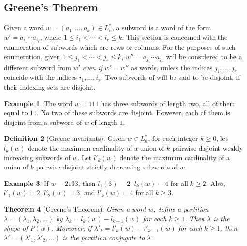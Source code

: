 \documentclass[11pt]{amsart}
\newtheorem{theorem}{Theorem}[subsection]
\theoremstyle{definition}
\newtheorem{definition}[theorem]{Definition}
\theoremstyle{example}
\newtheorem{example}[theorem]{Example}
\begin{document}
\subsection{Greene's Theorem}
\label{sec:greenes-theorem}
Given a word $w = (a_1,\dotsc,a_k)\in L_n^*$, a subword is a word of the form $w' = a_{i_1}\dotsb a_{i_r}$, where $1\leq i_1<\dotsb < i_r\leq k$.
This section is concerned with the enumeration of subwords which are rows or columns.
For the purposes of such enumeration, given $1 \leq j_1<\dotsb <j_r\leq k$, $w'' = a_{j_1}\dotsb a_{j_r}$ will be considered to be a different subword from $w'$ \emph{even if} $w'=w''$ as words, unless the indices $j_1,\dotsc, j_r$ coincide with the indices $i_1,\dotsc,i_r$.
Two subwords of will be said to be disjoint, if their indexing sets are disjoint.
\begin{example}
  The word $w=111$ has three subwords of length two, all of them equal to $11$.
  No two of these subwords are disjoint.
  However, each of them is disjoint from a subword of $w$ of length $1$.
\end{example}
\begin{definition}
  [Greene invariants]
  \label{definition:Greene-invars}
  Given $w \in L_n^*$, for each integer $k\geq 0$, let $l_k(w)$ denote the maximum cardinality of a union of $k$ pairwise disjoint weakly increasing subwords of $w$.
  Let $l'_k(w)$ denote the maximum cardinality of a union of $k$ pairwise disjoint strictly decreasing subwords of $w$.
\end{definition}
\begin{example}
  If $w=2133$, then $l_1(3)=2$, $l_k(w)=4$ for all $k\geq 2$.
  Also, $l'_1(w) = 2$, $l'_2(w)=3$, and $l'_k(w)=4$ for all $k\geq 3$.
\end{example}
\begin{theorem}
  [Greene's Theorem]
  \label{theorem:Greene}
  Given a word $w$, define a partition $\lambda=(\lambda_1,\lambda_2,\dotsc)$ by $\lambda_k=l_k(w)-l_{k-1}(w)$ for each $k\geq 1$.
  Then $\lambda$ is the shape of $P(w)$.
  Moreover, if $\lambda'_k=l'_k(w)-l'_{k-1}(w)$ for each $k\geq 1$, then $\lambda'=(\lambda'_1,\lambda'_2,\dotsc)$ is the partition conjugate to $\lambda$.
\end{theorem}
\end{document}
